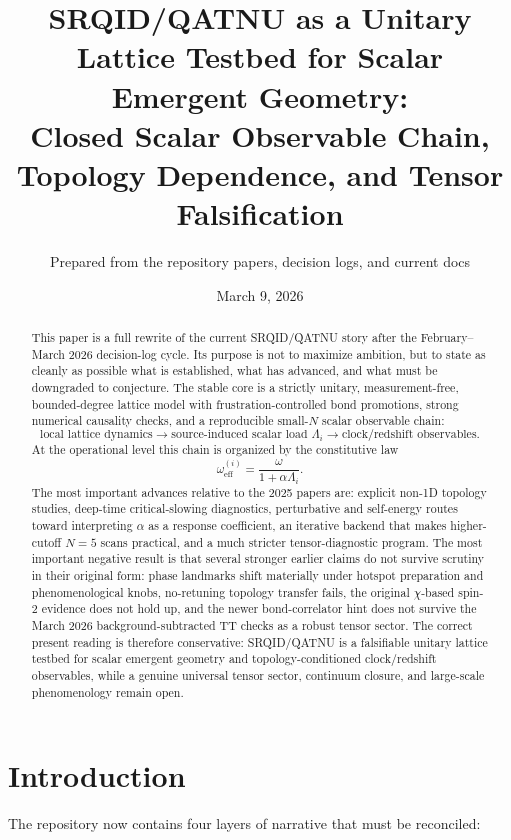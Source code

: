 \documentclass[11pt]{article}
\title{\textbf{SRQID/QATNU as a Unitary Lattice Testbed for Scalar Emergent Geometry:}\\
\textbf{Closed Scalar Observable Chain, Topology Dependence, and Tensor Falsification}}
\author{Prepared from the repository papers, decision logs, and current docs}
\date{March 9, 2026}
\begin{document}
\maketitle

\begin{abstract}
This paper is a full rewrite of the current SRQID/QATNU story after the February--March 2026 decision-log cycle. Its purpose is not to maximize ambition, but to state as cleanly as possible what is established, what has advanced, and what must be downgraded to conjecture. The stable core is a strictly unitary, measurement-free, bounded-degree lattice model with frustration-controlled bond promotions, strong numerical causality checks, and a reproducible small-$N$ scalar observable chain:
\[
\text{local lattice dynamics}
\rightarrow
\text{source-induced scalar load }\Lambda_i
\rightarrow
\text{clock/redshift observables}.
\]
At the operational level this chain is organized by the constitutive law
\[
\omega_{\mathrm{eff}}^{(i)} = \frac{\omega}{1+\alpha \Lambda_i}.
\]
The most important advances relative to the 2025 papers are: explicit non-1D topology studies, deep-time critical-slowing diagnostics, perturbative and self-energy routes toward interpreting $\alpha$ as a response coefficient, an iterative backend that makes higher-cutoff $N=5$ scans practical, and a much stricter tensor-diagnostic program. The most important negative result is that several stronger earlier claims do not survive scrutiny in their original form: phase landmarks shift materially under hotspot preparation and phenomenological knobs, no-retuning topology transfer fails, the original $\chi$-based spin-2 evidence does not hold up, and the newer bond-correlator hint does not survive the March 2026 background-subtracted TT checks as a robust tensor sector. The correct present reading is therefore conservative: SRQID/QATNU is a falsifiable unitary lattice testbed for scalar emergent geometry and topology-conditioned clock/redshift observables, while a genuine universal tensor sector, continuum closure, and large-scale phenomenology remain open.
\end{abstract}

\section{Introduction}

The repository now contains four layers of narrative that must be reconciled:
\end{document}
